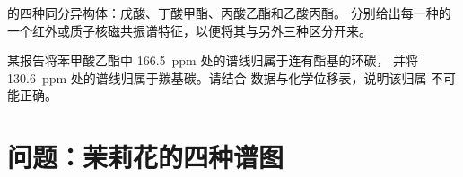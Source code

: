 \begin{exercise}[$\star\star\star$]\label{exo:b2:structure-determination:11}
 的四种同分异构体：戊酸、丁酸甲酯、丙酸乙酯和乙酸丙酯。
分别给出每一种的一个红外或质子核磁共振谱特征，以便将其与另外三种区分开来。
\end{exercise}

\begin{exercise}[$\star\star\star$]\label{exo:b2:structure-determination:12}
某报告将苯甲酸乙酯中 166.5~ppm 处的谱线归属于连有酯基的环碳，
并将 130.6~ppm 处的谱线归属于羰基碳。请结合  数据与化学位移表，说明该归属
不可能正确。
\end{exercise}

\section{问题：茉莉花的四种谱图}

